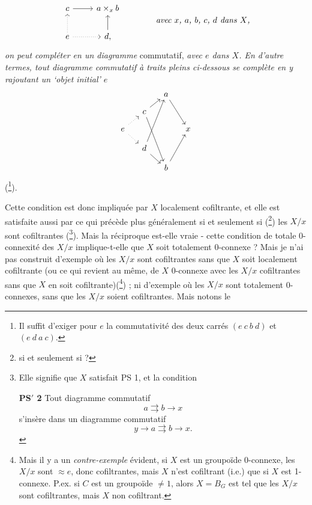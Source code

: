 \[
\begin{tikzcd}
c \arrow[r] & a\times_x b \\
e \arrow[u, dotted] \arrow[r, dotted] & d, \arrow[u]
\end{tikzcd}
\qquad\qquad
\textit{avec $x$, $a$, $b$, $c$, $d$ dans $X$,}
\]
\textit{on peut compléter en un diagramme} commutatif, \textit{avec $e$ dans $X$. En d'autre termes, tout diagramme commutatif à traits pleins ci-dessous se complète en y rajoutant un `objet initial' $e$} %
\[
\begin{tikzcd}[column sep=small, row sep=small]
 & & a \arrow[ddr] & \\
 & c \arrow[ur] \arrow[dddr] & & \\
e \arrow[ur, dotted] \arrow[dr, dotted] & & & x \\
 & d \arrow[uuur] \arrow[dr] & & \\
 & & b \arrow[uur] &
\end{tikzcd}
\]
(\footnote[33]{Il suffit d'exiger pour $e$ la commutativité des deux carrés $(e\ c\ b\ d)$ et $(e\ d\ a\ c)$.}).

Cette condition est donc impliquée par $X$ localement cofiltrante, et elle est satisfaite aussi par ce qui précède plus généralement si et seulement si (\footnote[34]{si et seulement si ?}) les $X/x$ sont cofiltrantes (\footnote[35]{Elle signifie que $X$ satisfait PS 1, et la condition

\textbf{PS$'$ 2} Tout diagramme commutatif
\[
a\rightrightarrows b\longrightarrow x
\]
s'insère dans un diagramme commutatif
\[
y\longrightarrow a\rightrightarrows b\longrightarrow x.
\]
}). Mais la réciproque est-elle vraie - cette condition de totale 0-connexité des $X/x$ implique-t-elle que $X$ soit totalement 0-connexe ? Mais je n'ai pas construit d'exemple où les $X/x$
sont cofiltrantes sans que $X$ soit localement cofiltrante (ou ce qui revient au même, de $X$ 0-connexe avec les $X/x$ cofiltrantes sans que $X$ en soit cofiltrante)(\footnote[36]{Mais il y a un \textit{contre-exemple} évident, si $X$ est un groupoïde 0-connexe, les $X/x$ sont $\approx e$, donc cofiltrantes, mais $X$ n'est cofiltrant (i.e.) que si $X$ est 1-connexe. P.ex. si $C$ est un groupoïde $\neq 1$, alors $X=B_G$ est tel que les $X/x$ sont cofiltrantes, mais $X$ non cofiltrant. %
}) ; ni d'exemple où les $X/x$ sont totalement 0-connexes, sans que les $X/x$ soient cofiltrantes. Mais notons le

